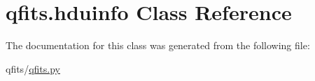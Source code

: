 \hypertarget{classqfits_1_1hduinfo}{}\section{qfits.\+hduinfo Class Reference}
\label{classqfits_1_1hduinfo}


The documentation for this class was generated from the following file\+:\begin{DoxyCompactItemize}
\item 
qfits/\hyperlink{qfits_8py}{qfits.\+py}\end{DoxyCompactItemize}
